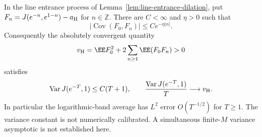 \documentclass[11pt,letterpaper]{article}
\begin{document}
\begin{proposition}
\label{prop:line-history-variance}
In the line entrance process of
Lemma~\ref{lem:line-entrance-dilation}, put
$F_n=J(e^{-n},e^{1-n})-a_{\rm H}$ for $n\in\mathbb Z$.
There are $C<\infty$ and $\eta>0$ such that
\begin{equation}\label{eq:line-history-covariance}
 |\operatorname{Cov}(F_0,F_n)|\le Ce^{-\eta|n|}.
\end{equation}
Consequently the absolutely convergent quantity
\[
 v_{\rm H}=\EE F_0^2+2\sum_{n\ge1}\EE(F_0F_n)>0
\]
satisfies
\begin{equation}\label{eq:line-history-variance}
 \operatorname{Var}J(e^{-T},1)\le C(T+1),\qquad
 \frac{\operatorname{Var}J(e^{-T},1)}T\longrightarrow v_{\rm H}.
\end{equation}
In particular the logarithmic-band average has $L^2$ error
$O(T^{-1/2})$ for $T\ge1$. The variance constant is not numerically
calibrated. A simultaneous finite-$M$ variance asymptotic is not
established here.
\end{proposition}
\end{document}
